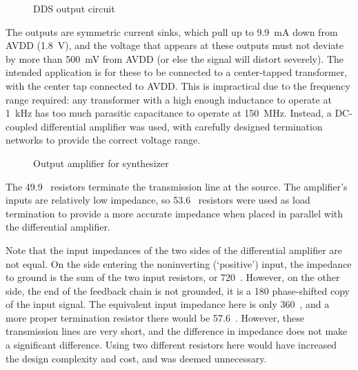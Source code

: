 \begin{figure}[H]
\centering
{}
\caption{DDS output circuit}
\label{fig:ddsoutput}
\end{figure}

The outputs are symmetric current sinks, which pull up to 9.9~mA
down from AVDD (1.8~V), and the voltage that appears at these
outputs must not deviate by more than 500~mV from AVDD (or else
the signal will distort severely). The intended application is for these
to be connected to a center-tapped transformer, with the center tap connected
to AVDD. This is impractical due to the frequency range required: any
transformer with a high enough inductance to operate at 1~kHz has
too much parasitic capacitance to operate at 150~MHz. Instead,
a DC-coupled differential amplifier was used, with carefully designed
termination networks to provide the correct voltage range.

\begin{figure}[H]
\centering
{}
\caption{Output amplifier for synthesizer}
\label{fig:synthoutput}
\end{figure}

The 49.9~\Ohm{} resistors terminate the transmission line at the
source. The amplifier's inputs are relatively low impedance, so 53.6~\Ohm{}
resistors were used as load termination to provide a more accurate impedance when
placed in parallel with the differential amplifier.

Note that the input impedances of the two sides of the differential amplifier
are not equal. On the side entering the noninverting (`positive') input, the
impedance to ground is the sum of the two input resistors, or 720~\Ohm{}.
However, on the other side, the end of the feedback chain is not grounded, it is
a 180\dg{} phase-shifted copy of the input signal. The equivalent input impedance
here is only 360~\Ohm{}, and a more proper termination resistor there
would be 57.6~\Ohm{}. However, these transmission lines are very short,
and the difference in impedance does not make a significant difference. Using
two different resistors here would have increased the design complexity and cost,
and was deemed unnecessary. 
    
